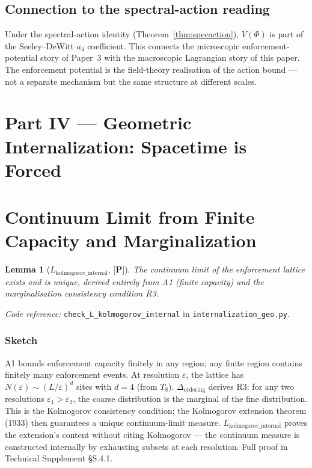 \documentclass[11pt]{article}
\newcommand{\coderef}[2]{\smallskip\noindent\textit{Code reference:} \texttt{#1} in \texttt{#2}.}
\newcommand{\epitag}[1]{\textbf{[#1]}}
\newtheorem{lemma}[theorem]{Lemma}
\theoremstyle{definition}
\begin{document}
\subsection{Connection to the spectral-action reading}
Under the spectral-action identity (Theorem~\ref{thm:specaction}), $V(\Phi)$ is part of the Seeley--DeWitt $a_4$ coefficient.  This connects the microscopic enforcement-potential story of Paper~3 with the macroscopic Lagrangian story of this paper.  The enforcement potential is the field-theory realisation of the action bound --- not a separate mechanism but the same structure at different scales.

\section*{Part IV — Geometric Internalization: Spacetime is Forced}

\section{Continuum Limit from Finite Capacity and Marginalization}\label{sec:continuum}

\begin{lemma}[$L_{\mathrm{kolmogorov\_internal}}$, $\epitag{P}$]
The continuum limit of the enforcement lattice exists and is unique, derived entirely from A1 (finite capacity) and the marginalisation consistency condition R3.
\end{lemma}

\coderef{check\_L\_kolmogorov\_internal}{internalization\_geo.py}

\subsubsection*{Sketch}
A1 bounds enforcement capacity finitely in any region; any finite region contains finitely many enforcement events.  At resolution $\varepsilon$, the lattice has $N(\varepsilon) \sim (L/\varepsilon)^d$ sites with $d = 4$ (from $T_8$).  $\Delta_{\mathrm{ordering}}$ derives R3: for any two resolutions $\varepsilon_1 > \varepsilon_2$, the coarse distribution is the marginal of the fine distribution.  This is the Kolmogorov consistency condition; the Kolmogorov extension theorem (1933) then guarantees a unique continuum-limit measure.  $L_{\mathrm{kolmogorov\_internal}}$ proves the extension's content without citing Kolmogorov --- the continuum measure is constructed internally by exhausting subsets at each resolution.  Full proof in Technical Supplement \S S.4.1.
\end{document}
